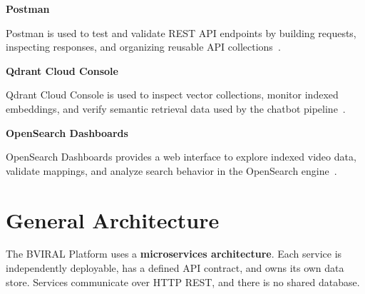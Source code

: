 
\textbf{Postman}

Postman is used to test and validate REST API endpoints by building requests, inspecting responses,
and organizing reusable API collections~.


\textbf{Qdrant Cloud Console}

Qdrant Cloud Console is used to inspect vector collections, monitor indexed embeddings, and verify
semantic retrieval data used by the chatbot pipeline~.


\textbf{OpenSearch Dashboards}

OpenSearch Dashboards provides a web interface to explore indexed video data, validate mappings, and
analyze search behavior in the OpenSearch engine~.


\section{General Architecture}

The BVIRAL Platform uses a \textbf{microservices architecture}. Each service is independently
deployable, has a defined API contract, and owns its own data store. Services communicate over
HTTP REST, and there is no shared database.

